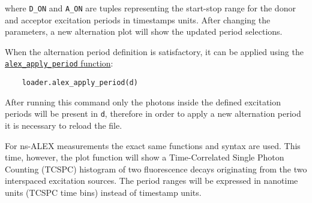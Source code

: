 where \verb|D_ON| and \verb|A_ON| are tuples representing 
the start-stop range for the donor and acceptor excitation periods 
in timestamps units. After changing the parameters, a new alternation plot will show the updated period selections.

When the alternation period definition is satisfactory, it can
be applied using the 
\href{http://fretbursts.readthedocs.org/en/latest/loader.html#fretbursts.loader.alex_apply_period}{\texttt{alex\_apply\_period} function}:

\begin{verbatim}
    loader.alex_apply_period(d)
\end{verbatim}

After running this command only the photons inside the defined excitation periods
will be present in \verb|d|, therefore in order to apply a new alternation period 
it is necessary to reload the file.

For ns-ALEX measurements the exact same functions and syntax are used.
This time, however, the plot function will show a Time-Correlated Single Photon Counting (TCSPC) histogram of two fluorescence decays originating from the two interspaced excitation sources. The period ranges will be expressed in nanotime units (TCSPC time bins) instead of 
timestamp units.
